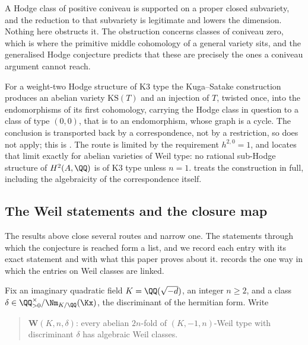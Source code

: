 \begin{remark}[Coniveau]\label{rem:coniveauscope}
A Hodge class of positive coniveau is supported on a proper closed
subvariety, and the reduction to that subvariety is legitimate and lowers the
dimension. Nothing here obstructs it. The obstruction concerns classes of
coniveau zero, which is where the primitive middle cohomology of a general
variety sits, and the generalised Hodge conjecture predicts that these are
precisely the ones a coniveau argument cannot reach.
\end{remark}

\begin{remark}\label{rem:ksscope}
For a weight-two Hodge structure of K3 type the Kuga--Satake construction
produces an abelian variety $\mathrm{KS}(T)$ and an injection of $T$, twisted
once, into the endomorphisms of its first cohomology, carrying the Hodge class
in question to a class of type $(0,0)$, that is to an endomorphism, whose graph
is a cycle. The conclusion is transported back by a correspondence, not by a
restriction, so \cite[Theorem~10.3]{paperI} does not apply; this is
\cite[Proposition~11.9]{paperI}. The route is limited by the requirement
$h^{2,0}=1$, and \cite[Proposition~11.11]{paperI} locates that limit exactly for abelian
varieties of Weil type: no rational sub-Hodge structure of $H^{2}(A,\QQ)$ is of
K3 type unless $n=1$. \cite[Section~11]{paperI} treats the construction in full, including
the algebraicity of the correspondence itself.
\end{remark}

\subsection{The Weil statements and the closure map}
\label{ssec:closuremap}

The results above close several routes and narrow one. The statements
through which the conjecture is reached form a list, and we record each
entry with its exact statement and with what this paper proves about it.
 records the one way in which the entries on Weil classes
are linked.

Fix an imaginary quadratic field $K=\QQ(\sqrt{-d})$, an integer $n\ge2$, and a
class $\delta\in\QQ^{\times}_{>0}/\Nm_{K/\QQ}(\Kx)$, the discriminant of the
hermitian form. Write
\begin{quote}
$\mathbf{W}(K,n,\delta)$: every abelian $2n$-fold of $(K,-1,n)$-Weil type with
discriminant $\delta$ has algebraic Weil classes.
\end{quote}

